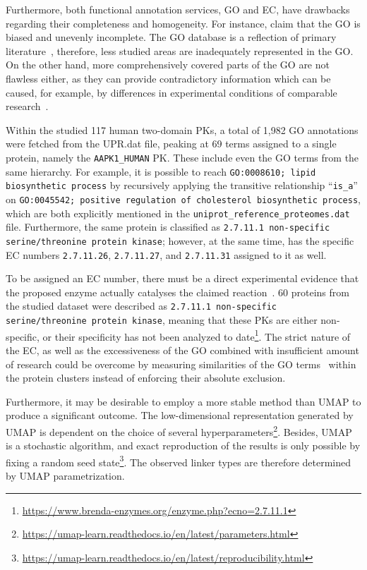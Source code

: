 Furthermore, both functional annotation services, GO and EC, have drawbacks regarding
their completeness and homogeneity.
For instance, \citet{gaudet2017gene} claim that the GO is biased and unevenly incomplete.
The GO database is a reflection of primary literature~\cite{gene2004gene}, therefore, less
studied areas are inadequately represented in the GO.
On the other hand, more comprehensively covered parts of the GO are not flawless either,
as they can provide contradictory information which can be caused, for example, by
differences in experimental conditions of comparable
research~\cite{hass2004response, mason2005multiple}.

Within the studied 117 human two-domain PKs, a total of 1,982 GO annotations were fetched
from the UPR.dat file, peaking at 69 terms assigned to a single protein, namely the
\texttt{AAPK1\_HUMAN} PK.
These include even the GO terms from the same hierarchy.
For example, it is possible to reach \texttt{GO:0008610; lipid biosynthetic process} by
recursively applying the transitive relationship ``\texttt{is\_a}'' on
\texttt{GO:0045542; positive regulation of cholesterol biosynthetic process}, which are
both explicitly mentioned in the \texttt{uniprot\_reference\_proteomes.dat} file.
Furthermore, the same protein is classified as \texttt{2.7.11.1 non-specific
serine/threonine protein kinase}; however, at the same time, has the specific EC numbers
\texttt{2.7.11.26}, \texttt{2.7.11.27}, and \texttt{2.7.11.31} assigned to it as well.

To be assigned an EC number, there must be a direct experimental evidence that the
proposed enzyme actually catalyses the claimed reaction~\cite{mcdonald2014fifty}.
60 proteins from the studied dataset were described as \texttt{2.7.11.1 non-specific
serine/threonine protein kinase}, meaning that these PKs are either non-specific,
or their specificity has not been analyzed to
date\footnote{\url{https://www.brenda-enzymes.org/enzyme.php?ecno=2.7.11.1}}.
The strict nature of the EC, as well as the excessiveness of the GO combined with
insufficient amount of research could be overcome by measuring similarities of the GO
terms~\cite{li2010effectively, zhao2018gogo} within the protein clusters instead of
enforcing their absolute exclusion.

Furthermore, it may be desirable to employ a more stable method than UMAP to produce a
significant outcome.
The low-dimensional representation generated by UMAP is dependent on the
choice of several
hyperparameters\footnote{\url{https://umap-learn.readthedocs.io/en/latest/parameters.html}}.
Besides, UMAP is a stochastic algorithm, and exact reproduction of the results is only
possible by fixing a random seed
state\footnote{\url{https://umap-learn.readthedocs.io/en/latest/reproducibility.html}}.
The observed linker types are therefore determined by UMAP parametrization.


